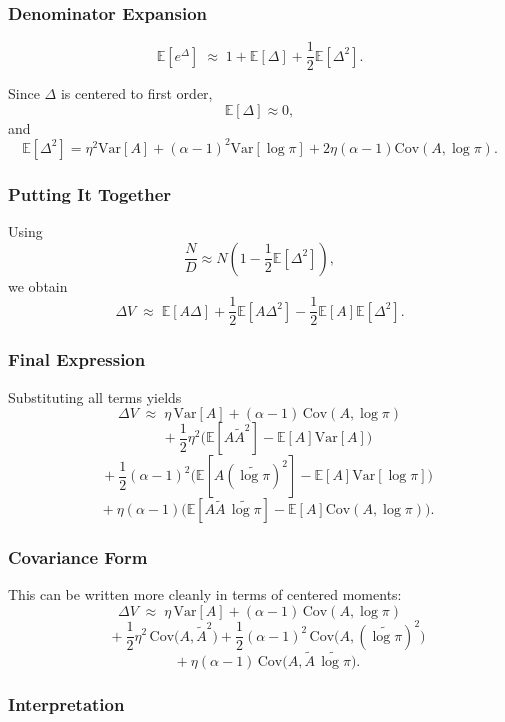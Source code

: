 \documentclass[11pt]{article}
\theoremstyle{definition}
\theoremstyle{remark}
\begin{document}
\subsubsection*{Denominator Expansion}

\[
\mathbb{E}[e^{\Delta}]
\;\approx\;
1 + \mathbb{E}[\Delta] + \frac{1}{2}\mathbb{E}[\Delta^2].
\]

Since $\Delta$ is centered to first order,
\[
\mathbb{E}[\Delta] \approx 0,
\]
and
\[
\mathbb{E}[\Delta^2]
=
\eta^2 \mathrm{Var}[A]
+ (\alpha-1)^2 \mathrm{Var}[\log \pi]
+ 2\eta(\alpha-1)\mathrm{Cov}(A,\log \pi).
\]

\subsubsection*{Putting It Together}

Using
\[
\frac{N}{D}
\approx
N \left(1 - \frac{1}{2}\mathbb{E}[\Delta^2]\right),
\]
we obtain
\[
\Delta V
\;\approx\;
\mathbb{E}[A \Delta]
+
\frac{1}{2}\mathbb{E}[A \Delta^2]
-
\frac{1}{2}\mathbb{E}[A]\mathbb{E}[\Delta^2].
\]

\subsubsection*{Final Expression}

Substituting all terms yields
\[
\Delta V
\;\approx\;
\eta\,\mathrm{Var}[A]
+ (\alpha-1)\,\mathrm{Cov}(A,\log \pi)
\]
\[
\quad
+ \frac{1}{2}\eta^2
\Big(
\mathbb{E}[A \tilde A^2]
- \mathbb{E}[A]\mathrm{Var}[A]
\Big)
\]
\[
\quad
+ \frac{1}{2}(\alpha-1)^2
\Big(
\mathbb{E}[A (\widetilde{\log \pi})^2]
- \mathbb{E}[A]\mathrm{Var}[\log \pi]
\Big)
\]
\[
\quad
+ \eta(\alpha-1)
\Big(
\mathbb{E}[A \tilde A\,\widetilde{\log \pi}]
- \mathbb{E}[A]\mathrm{Cov}(A,\log \pi)
\Big).
\]

\subsubsection*{Covariance Form}

This can be written more cleanly in terms of centered moments:
\[
\Delta V
\;\approx\;
\eta\,\mathrm{Var}[A]
+ (\alpha-1)\,\mathrm{Cov}(A,\log \pi)
\]
\[
\quad
+ \frac{1}{2}\eta^2\,\mathrm{Cov}\!\big(A,\tilde A^2\big)
+ \frac{1}{2}(\alpha-1)^2\,\mathrm{Cov}\!\big(A,(\widetilde{\log \pi})^2\big)
\]
\[
\quad
+ \eta(\alpha-1)\,\mathrm{Cov}\!\big(A,\tilde A\,\widetilde{\log \pi}\big).
\]

\subsubsection*{Interpretation}
\end{document}
